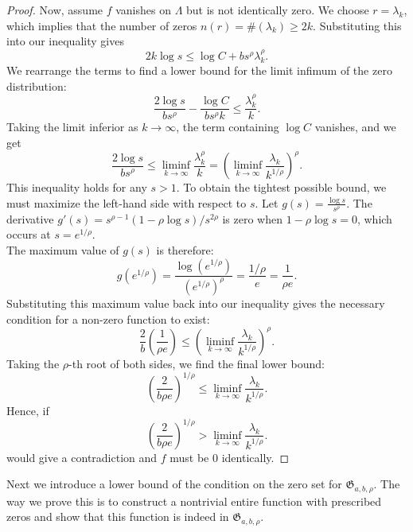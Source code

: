 \documentclass[graybox]{svmult}
\newcommand{\fG}{\mathfrak{G}}
\begin{document}
\begin{proof}
    Now, assume $f$ vanishes on $\Lambda$ but is not identically zero. We choose $r = \lambda_k$, which implies that the number of zeros $n(r) = \#(\lambda_k) \ge 2k$. Substituting this into our inequality gives
    \begin{equation*}
        2k \log s \le \log C + bs^\rho \lambda_k^\rho.
    \end{equation*}
    We rearrange the terms to find a lower bound for the limit infimum of the zero distribution:
    \begin{equation*}
        \frac{2 \log s}{bs^\rho} - \frac{\log C}{bs^\rho k} \le \frac{\lambda_k^\rho}{k}.
    \end{equation*}
    Taking the limit inferior as $k \to \infty$, the term containing $\log C$ vanishes, and we get
    \begin{equation*}
        \frac{2 \log s}{bs^\rho} \le \liminf_{k \to \infty} \frac{\lambda_k^\rho}{k} = \left( \liminf_{k \to \infty} \frac{\lambda_k}{k^{1/\rho}} \right)^\rho.
    \end{equation*}
    This inequality holds for any $s>1$. To obtain the tightest possible bound, we must maximize the left-hand side with respect to $s$. Let $g(s) = \frac{\log s}{s^\rho}$. The derivative $g'(s) = s^{\rho-1}(1 - \rho\log s) / s^{2\rho}$ is zero when $1 - \rho\log s = 0$, which occurs at $s = e^{1/\rho}$. \\
    The maximum value of $g(s)$ is therefore:
    \begin{equation*}
        g(e^{1/\rho}) = \frac{\log(e^{1/\rho})}{(e^{1/\rho})^\rho} = \frac{1/\rho}{e} = \frac{1}{\rho e}.
    \end{equation*}
    Substituting this maximum value back into our inequality gives the necessary condition for a non-zero function to exist:
    \begin{equation*}
        \frac{2}{b} \left( \frac{1}{\rho e} \right) \le \left( \liminf_{k \to \infty} \frac{\lambda_k}{k^{1/\rho}} \right)^\rho.
    \end{equation*}
    Taking the $\rho$-th root of both sides, we find the final lower bound:
    \begin{equation*}
        \left( \frac{2}{b\rho e} \right)^{1/\rho} \le \liminf_{k \to \infty} \frac{\lambda_k}{k^{1/\rho}}.
    \end{equation*}
    Hence, if
    \begin{equation*}
        \left( \frac{2}{b\rho e} \right)^{1/\rho} > \liminf_{k \to \infty} \frac{\lambda_k}{k^{1/\rho}}.
    \end{equation*}
    would give a contradiction and $f$ must be $0$ identically.
\end{proof}
Next we introduce a lower bound of the condition on the zero set for $\fG_{a,b,\rho}$. The way we prove this is to construct a nontrivial entire function with prescribed zeros and show that this function is indeed in $\fG_{a,b,\rho}$.
\end{document}

